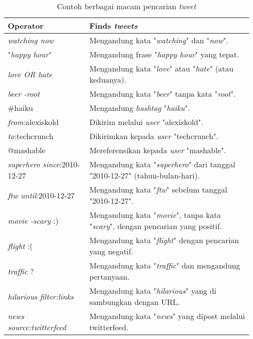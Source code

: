 \begin{table}[h]
\begin{tabular}{|p{5cm}|p{9cm}|}
\hline
\textbf{Operator}          					& \textbf{Finds \textit{tweets}}                                            \\ \hline
\textit{watching now}               & Mengandung kata "\textit{watching}" dan "\textit{now}". 						       \\
"\textit{happy hour}"               & Mengandung frase "\textit{happy hour}" yang tepat.                                 \\
\textit{love OR hate}               & Mengandung kata "\textit{love}" atau "\textit{hate}" (atau keduanya).                             \\
\textit{beer -root}                 & Mengandung kata "\textit{beer}" tanpa kata "\textit{root}".                                         \\
\#haiku                    					& Mengandung \textit{hashtag} "\textit{haiku}".                                            \\
\textit{from}:alexiskold            & Dikirim melalui \textit{user} "alexiskold".                                            \\
\textit{to}:techcrunch              & Dikirimkan kepada \textit{user} "techcrunch".                                              \\
@mashable                  					& Mereferensikan kepada \textit{user} "mashable".                                            \\
\textit{superhero since}:2010-12-27 & Mengandung kata "\textit{superhero}" dari tanggal "2010-12-27" (tahun-bulan-hari). \\
\textit{ftw until}:2010-12-27       & Mengandung kata "\textit{ftw}" sebelum tanggal "2010-12-27".                   \\
\textit{movie -scary} :)            & Mengandung kata "\textit{movie}", tanpa kata "\textit{scary}", dengan pencarian yang positif.        \\
\textit{flight} :(                  & Mengandung kata "\textit{flight}" dengan pencarian yang negatif.                         \\
\textit{traffic} ?                  & Mengandung kata "\textit{traffic}" dan mengandung pertanyaan.                               \\
\textit{hilarious filter:links}     & Mengandung kata "\textit{hilarious}" yang di sambungkan dengan URL.                                \\
\textit{news source:twitterfeed}    & Mengandung kata "\textit{news}" yang dipost melalui twitterfeed.						\\        \hline                     
\end{tabular}
\caption{Contoh berbagai macam pencarian \textit{tweet}}
\label{tab:MacamPencarianTweet}
\end{table}

